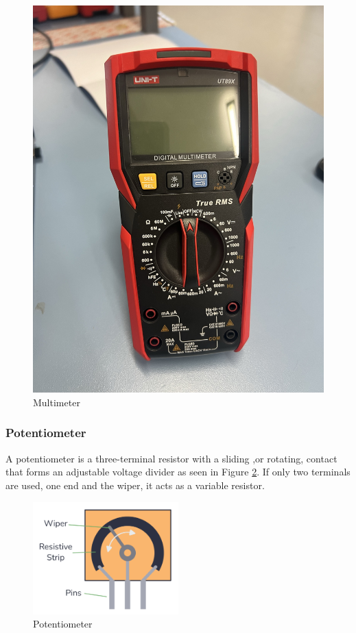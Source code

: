 \documentclass[a4paper, 10pt]{article}
\begin{document}
				\begin{figure}[h!]
					\centering
					\includegraphics[height = 0.3\textheight]{images/Multimeter.jpeg}
					\caption{Multimeter}
					\label{fig:multi_meter}
				\end{figure}
			
			\subsubsection{Potentiometer}
				A potentiometer is a three-terminal resistor with a sliding ,or rotating, contact that forms an adjustable voltage divider as seen in Figure \ref{fig:potentiometer}.
				If only two terminals are used, one end and the wiper, it acts as a variable resistor.
				\begin{figure}[h!]
					\centering
					\includegraphics[width=0.5\textwidth]{images/Potentiometer.png}
					\caption{Potentiometer}
					\label{fig:potentiometer}
				\end{figure}
\end{document}

